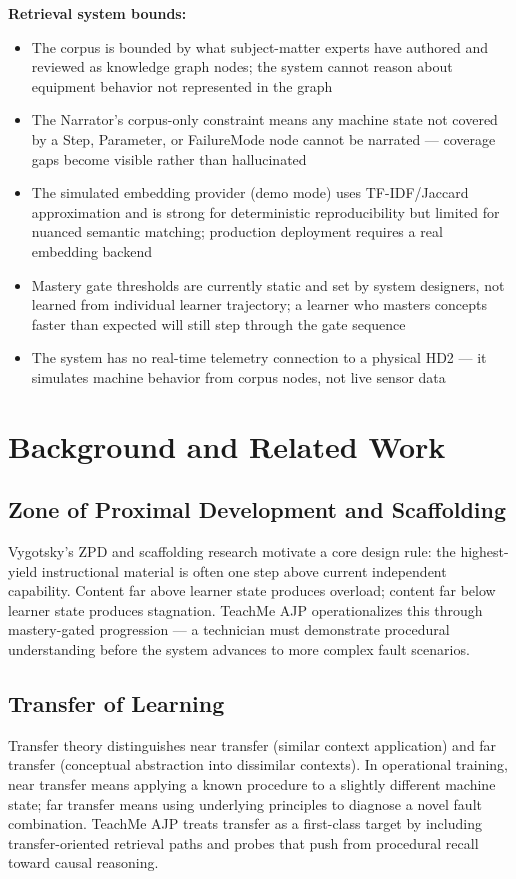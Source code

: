 \documentclass[11pt,letterpaper]{article}
\begin{document}
\textbf{Retrieval system bounds:}
\begin{itemize}
  \item The corpus is bounded by what subject-matter experts have authored and reviewed as knowledge graph nodes; the system cannot reason about equipment behavior not represented in the graph
  \item The Narrator's corpus-only constraint means any machine state not covered by a Step, Parameter, or FailureMode node cannot be narrated --- coverage gaps become visible rather than hallucinated
  \item The simulated embedding provider (demo mode) uses TF-IDF/Jaccard approximation and is strong for deterministic reproducibility but limited for nuanced semantic matching; production deployment requires a real embedding backend
  \item Mastery gate thresholds are currently static and set by system designers, not learned from individual learner trajectory; a learner who masters concepts faster than expected will still step through the gate sequence
  \item The system has no real-time telemetry connection to a physical HD2 --- it simulates machine behavior from corpus nodes, not live sensor data
\end{itemize}

\section{Background and Related Work}
\label{sec:background}

\subsection{Zone of Proximal Development and Scaffolding}
Vygotsky's ZPD and scaffolding research motivate a core design rule: the highest-yield instructional material is often one step above current independent capability. Content far above learner state produces overload; content far below learner state produces stagnation. TeachMe AJP operationalizes this through mastery-gated progression --- a technician must demonstrate procedural understanding before the system advances to more complex fault scenarios.

\subsection{Transfer of Learning}
Transfer theory distinguishes near transfer (similar context application) and far transfer (conceptual abstraction into dissimilar contexts). In operational training, near transfer means applying a known procedure to a slightly different machine state; far transfer means using underlying principles to diagnose a novel fault combination. TeachMe AJP treats transfer as a first-class target by including transfer-oriented retrieval paths and probes that push from procedural recall toward causal reasoning.
\end{document}
